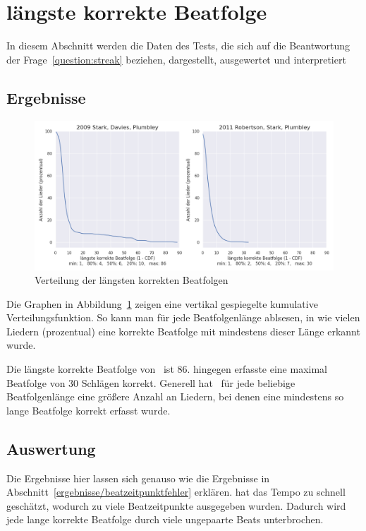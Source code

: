 \section{längste korrekte Beatfolge}
{
	In diesem Abschnitt werden die Daten des Tests,
		die sich auf die Beantwortung der Frage~\ref{question:streak} beziehen,
 		dargestellt, ausgewertet und interpretiert

	\subsection{Ergebnisse}
	{
		\begin{figure}[h]
			\centering
			\includegraphics[scale=0.47]{resources/longest_streak.png}
			\caption{Verteilung der längsten korrekten Beatfolgen}
			\label{fig:longest_streak}
		\end{figure}

		Die Graphen in Abbildung~\ref{fig:longest_streak} zeigen eine vertikal gespiegelte kumulative Verteilungsfunktion.
		So kann man für jede Beatfolgenlänge ablsesen,
			in wie vielen Liedern (prozentual) eine korrekte Beatfolge mit mindestens dieser Länge erkannt wurde.

		Die längste korrekte Beatfolge von~\cite{2009_DaPlSt} ist \num{86}.
		\cite{2011_PlRoSt} hingegen erfasste eine maximal Beatfolge von \num{30} Schlägen korrekt.
		Generell hat~\cite{2009_DaPlSt} für jede beliebige Beatfolgenlänge eine grö{\ss}ere Anzahl an Liedern,
			bei denen eine mindestens so lange Beatfolge korrekt erfasst wurde.
	}

	\subsection{Auswertung}
	{
		Die Ergebnisse hier lassen sich genauso wie die Ergebnisse in Abschnitt~\ref{ergebnisse/beatzeitpunktfehler} erklären.
		\cite{2011_PlRoSt} hat das Tempo zu schnell geschätzt,
			wodurch zu viele Beatzeitpunkte ausgegeben wurden.
		Dadurch wird jede lange korrekte Beatfolge durch viele ungepaarte Beats unterbrochen.
	}

}

